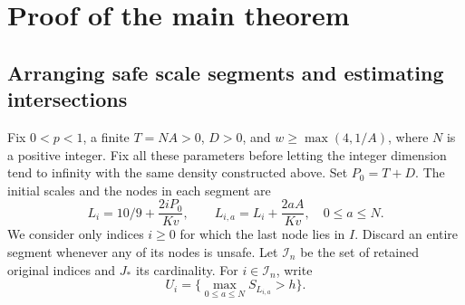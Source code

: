 \documentclass[a4paper,11pt]{article}
\theoremstyle{remark}
\begin{document}
\section{Proof of the main theorem}\label{sec:mainproof}
\subsection{Arranging safe scale segments and estimating intersections}
Fix \(0<p<1\), a finite \(T=NA>0\), \(D>0\), and
\(w\ge\max(4,1/A)\), where \(N\) is a positive integer. Fix all these
parameters before letting the integer dimension tend to infinity with the same
density constructed above. Set \(P_0=T+D\). The initial scales and the nodes in
each segment are
\[
 L_i=10/9+\frac{2iP_0}{Kv},\qquad
 L_{i,a}=L_i+\frac{2aA}{Kv},\quad0\le a\le N.
\]
We consider only indices \(i\ge0\) for which the last node lies in \(I\).
Discard an entire segment whenever any of its nodes is unsafe.
Let \(\mathcal I_n\) be the set of retained original indices and \(J_*\) its
cardinality. For \(i\in\mathcal I_n\), write
\[
 U_i=\{\max_{0\le a\le N}S_{L_{i,a}}>h\}.
\]
\end{document}
